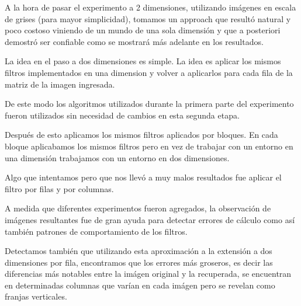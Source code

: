 A la hora de pasar el experimento a 2 dimensiones, utilizando im\'agenes en
escala de grises (para mayor simplicidad), tomamos un approach que result\'o
natural y poco costoso viniendo de un mundo de una sola dimensi\'on y que a
posteriori demostr\'o ser confiable como se mostrar\'a m\'as adelante en los
resultados.

La idea en el paso a dos dimensiones es simple. La idea es aplicar los mismos
filtros implementados en una dimension y volver a aplicarlos para cada fila de
la matriz de la imagen ingresada.

De este modo los algoritmos utilizados durante la primera parte del experimento
fueron utilizados sin necesidad de cambios en esta segunda etapa.

Despu\'es de esto aplicamos los mismos filtros aplicados por bloques. En cada bloque
aplicabamos los mismos filtros pero en vez de trabajar con un entorno en una dimensi\'on
trabajamos con un entorno en dos dimensiones. 

Algo que intentamos pero que nos llev\'o a muy malos resultados fue aplicar el filtro por filas y por columnas.

A medida que diferentes experimentos fueron agregados, la observaci\'on de
im\'agenes resultantes fue de gran ayuda para detectar errores de c\'alculo como
as\'i tambi\'en patrones de comportamiento de los filtros.

Detectamos tambi\'en que utilizando esta aproximaci\'on a la extensi\'on a dos
dimensiones por fila, encontramos que los errores m\'as groseros, es decir las
diferencias m\'as notables entre la im\'agen original y la recuperada, se
encuentran en determinadas columnas que var\'ian en cada im\'agen pero se
revelan como franjas verticales.
